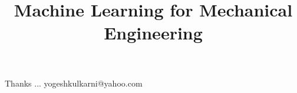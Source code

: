 \documentclass[xcolor=dvipsnames,compress,t,pdf,notes]{beamer}
\title[\insertframenumber /\inserttotalframenumber]{Machine Learning for Mechanical Engineering}
\begin{document}
	\begin{frame}
	\titlepage
	\end{frame}
	
	\newpage 
	
	\newpage 
	

	\begin{frame}[c]{}
	Thanks ...
	\vspace{5mm}
	yogeshkulkarni@yahoo.com
	\end{frame}
\end{document}
